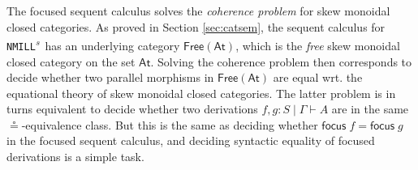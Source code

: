 \documentclass[submission,copyright,creativecommons]{eptcs}
\theoremstyle{definition}
\newcommand{\NMILL}{\texttt{NMILL}}
\newcommand{\SkNMILL}{\NMILL\textsuperscript{\textit{s}}}
\newcommand{\FSkMCC}{\textsf{Free}}
\begin{document}
The focused sequent calculus solves the \emph{coherence problem} for skew monoidal closed categories.
As proved in Section \ref{sec:catsem}, the sequent calculus for \SkNMILL\ has an underlying category $\FSkMCC(\mathsf{At})$, which is the \emph{free} skew monoidal closed category on the set $\mathsf{At}$. Solving the coherence problem then corresponds to decide whether two parallel morphisms in $\FSkMCC(\mathsf{At})$ are equal wrt. the equational theory of skew monoidal closed categories. The latter problem is in turns equivalent to decide whether two derivations $f,g : S \mid \Gamma \vdash A$ are in the same $\circeq$-equivalence class. But this is the same as deciding whether $\mathsf{focus}\;f = \mathsf{focus}\;g$ in the focused sequent calculus, and deciding syntactic equality of focused derivations is a simple task.


\end{document}
